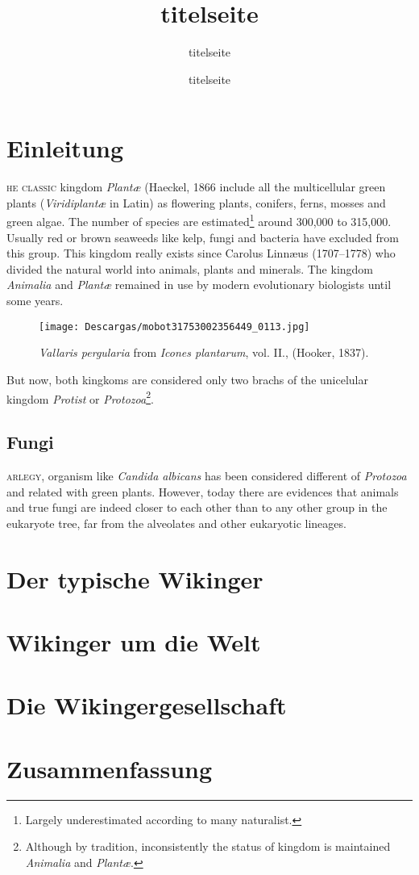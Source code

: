 \documentclass[twoside,12pt,a4paper,ngerman]{book}
\newcommand{\flettrine}[2]{\lettrine[lines=2, depth=0]{\initfamily{#1}}{ #2}}
\newcommand*\initfamily{\usefont{U}{GotIn}{xl}{n}}
\newcommand{\fchapter}[1]{\chapter{#1}\thispagestyle{chapterstyle}}
\begin{document}
\author{titelseite}
\date{titelseite}
\title{titelseite}

\maketitle
\thispagestyle{empty}
\tableofcontents
\thispagestyle{empty}
\newpage
\thispagestyle{empty}

\fchapter{Einleitung}

\flettrine{T}{he classic} kingdom \emph{Plant\ae} (Haeckel, 1866
include all the multicellular green plants (\emph{Viridiplant\ae} in Latin) as flowering  
plants, conifers, ferns, mosses and green algae. The number of species 
are estimated\footnote{Largely underestimated according to many naturalist.} around 300,000 to 315,000.
Usually red or brown seaweeds like kelp, fungi and bacteria have
excluded from this group.
This kingdom really exists since Carolus Linn\ae us (1707--1778) who 
divided the natural world into animals, plants and minerals. The kingdom \emph{Animalia}  and \emph{Plant\ae} remained 
in use by modern evolutionary biologists until some years.  

\begin{wrapfigure}{r}{0.26\textwidth}
\centering
\texttt{[image: Descargas/mobot31753002356449\_0113.jpg]}
\caption{\footnotesize \emph{Vallaris pergularia} from \emph{Icones plantarum}, vol. II., (Hooker, 1837).}
\label{fig1}
\end{wrapfigure}
But now, both kingkoms are considered only two brachs of the unicelular kingdom \emph{Protist} 
or \emph{Protozoa}\footnote{Although by tradition,  inconsistently the status of kingdom 
is maintained \emph{Animalia}  and \emph{Plant\ae}.}.  
\lipsum[2]

\lipsum[3]

\section{Fungi}

\flettrine{L}{arlegy}, organism like \emph{Candida albicans} has
 been considered different of \emph{Protozoa} and related with green plants. However, today there 
 are evidences that animals and true fungi are indeed closer to each other than to any other group 
 in the eukaryote tree, far from the alveolates and other eukaryotic lineages.  


\lipsum[4-6]

\fchapter{Der typische Wikinger}
\fchapter{Wikinger um die Welt}
\fchapter{Die Wikingergesellschaft}
\fchapter{Zusammenfassung} %
\end{document}
